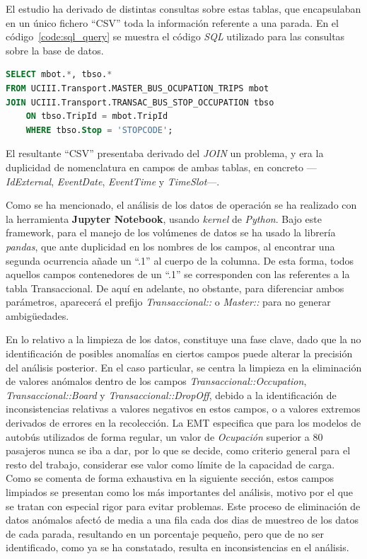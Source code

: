 El estudio ha derivado de distintas consultas sobre estas tablas, que encapsulaban en un único fichero 
\enquote{CSV} toda la información referente a una parada. En el código~\ref{code:sql_query} se 
muestra el código \textit{SQL} utilizado para las consultas sobre la base de datos.


\begin{lstlisting}[language=SQL, caption={Datos totales de una parada}, label={code:sql_query}]
SELECT mbot.*, tbso.*
FROM UCIII.Transport.MASTER_BUS_OCUPATION_TRIPS mbot
JOIN UCIII.Transport.TRANSAC_BUS_STOP_OCCUPATION tbso
    ON tbso.TripId = mbot.TripId
    WHERE tbso.Stop = 'STOPCODE';

\end{lstlisting}
\par\vspace{4pt}{\footnotesize Fuente: documento facilitado por la EMT.}

El resultante \enquote{CSV} presentaba derivado  del \textit{JOIN} un problema, y era la duplicidad
de nomenclatura en campos de  ambas tablas, en concreto ---\textit{IdExternal}, \textit{EventDate}, 
\textit{EventTime} y \textit{TimeSlot}---.

Como se ha mencionado, el análisis de los datos de operación se ha realizado con la herramienta
\textbf{Jupyter Notebook}, usando \textit{kernel} de \textit{Python}. Bajo este framework, para el 
manejo de los volúmenes de datos se ha usado la librería \textit{pandas}, que ante duplicidad 
en los nombres de los campos, al encontrar una segunda ocurrencia añade un \enquote{.1} al cuerpo de la columna.
De esta forma, todos aquellos campos contenedores de un \enquote{.1} se corresponden con las referentes
a la tabla Transaccional. De aquí en adelante, no obstante, para diferenciar ambos parámetros, aparecerá
el prefijo \textit{Transaccional::} o \textit{Master::} para no generar ambigüedades.

En lo relativo a la limpieza de los datos, constituye una fase clave, dado que
la no identificación de posibles anomalías en ciertos campos puede alterar la precisión del análisis
posterior. En el caso particular, se centra la limpieza en la eliminación de valores anómalos dentro
de los campos \textit{Transaccional::Occupation}, \textit{Transaccional::Board} y 
\textit{Transaccional::DropOff}, debido a la identificación de inconsistencias relativas a valores
negativos en estos campos, o a valores extremos derivados de errores en la recolección.
La EMT especifica que para los modelos de autobús utilizados de forma regular, un valor de 
\textit{Ocupación} superior a 80 pasajeros nunca se iba a dar, por lo que se decide, como criterio general para el resto
del trabajo, considerar ese valor como límite de la capacidad de carga.
Como se comenta de forma exhaustiva en la siguiente sección, estos campos limpiados se presentan como los 
más importantes del análisis, motivo por el que se tratan con especial rigor para evitar problemas.
Este proceso de eliminación de datos anómalos afectó de media a una fila cada dos dias de muestreo de los datos de cada parada,
resultando en un porcentaje pequeño, pero que de no ser identificado, como ya se ha constatado, 
resulta en inconsistencias en el análisis.

